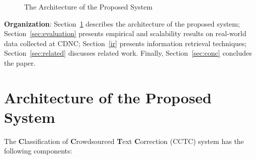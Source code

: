 \documentclass{sig-alternate}
\begin{document}
\begin{figure*}[t]
\centering
{}
\caption{The Architecture of the Proposed System}
\label{fig:arch}
\end{figure*}

\noindent \textbf{Organization}: Section~\ref{arch} describes the architecture of the proposed system; Section~\ref{sec:evaluation} presents empirical and scalability results on real-world data collected at CDNC; Section~\ref{ir} presents information retrieval techniques; Section~\ref{sec:related} discusses related work. Finally, Section~\ref{sec:conc} concludes the paper.

\section{Architecture of the Proposed System}
\label{arch}
The \textbf{C}lassification of \textbf{C}rowdsourced \textbf{T}ext \textbf{C}orrection (CCTC) system has the following components:
\end{document}
